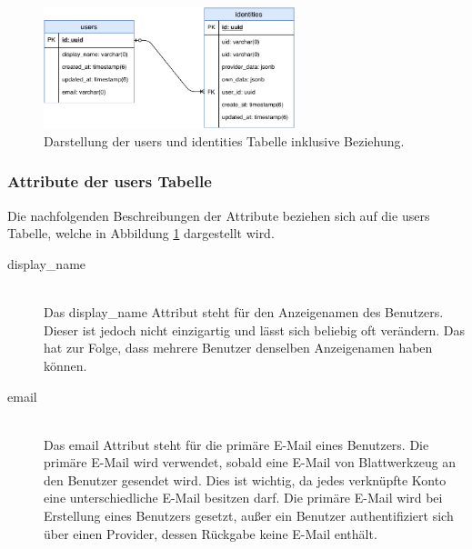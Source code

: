 \begin{figure}[h]
	\centering
	\includegraphics[width=0.65\textwidth]{graphics/users-identities.pdf}
	\caption{Darstellung der users und identities Tabelle inklusive Beziehung.}
	\label{fig:server-users-identities}
\end{figure}

\subsubsection*{Attribute der users Tabelle}
Die nachfolgenden Beschreibungen der Attribute beziehen sich auf die users Tabelle, welche in Abbildung \ref{fig:server-users-identities} dargestellt wird.
\begin{description}
	\item[display\_name]\hfill\\
	Das display\_name Attribut steht für den Anzeigenamen des Benutzers. Dieser ist jedoch nicht einzigartig und lässt sich beliebig oft verändern. Das hat zur Folge, dass mehrere Benutzer denselben Anzeigenamen haben können.
	\item[email]\hfill\\
	Das email Attribut steht für die primäre E-Mail eines Benutzers. Die primäre E-Mail wird verwendet, sobald eine E-Mail von Blattwerkzeug an den Benutzer gesendet wird. Dies ist wichtig, da jedes verknüpfte Konto eine unterschiedliche E-Mail besitzen darf. Die primäre E-Mail wird bei Erstellung eines Benutzers gesetzt, au{\ss}er ein Benutzer authentifiziert sich über einen Provider, dessen Rückgabe keine E-Mail enthält.
\end{description}


